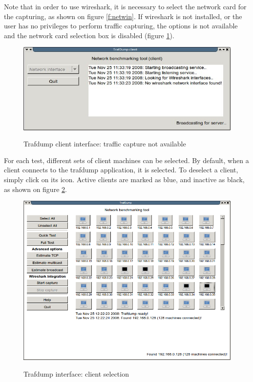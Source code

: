 \documentclass[12pt]{report}
\begin{document}
\begin{itemize}
Note that in order to use wireshark, it is necessary to select the
network card for the capturing, as shown on figure \ref{f:netwin}. If
wireshark is not installed, or the user has no privileges to perform traffic
capturing, the options is not available and the network card selection
box is disabled (figure \ref{f:netlin}).

\begin{figure}
\centering
\includegraphics[scale=0.5]{netlin.jpg}
\label{f:netlin}
\caption{Trafdump client interface: traffic capture not available}
\end{figure}

\end{itemize}

For each test, different sets of client machines can be selected. By default, when
a client connects to the trafdump application, it is selected. To deselect a
client, simply click on its icon. Active clients are marked as blue, and
inactive as black, as shown on figure \ref{f:clients}.

\begin{figure}[h!t]
\centering
\includegraphics[scale=0.5]{clients.png}
\label{f:clients}
\caption{Trafdump interface: client selection}
\end{figure}
\end{document}
